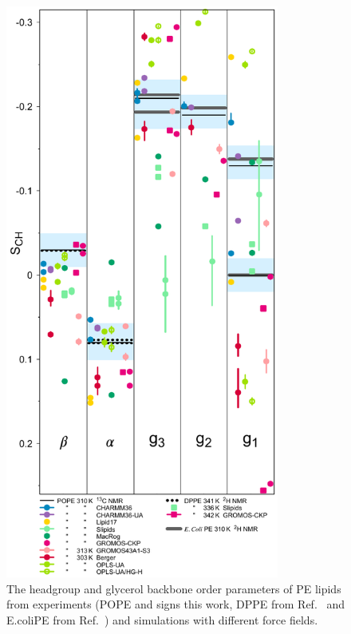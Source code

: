 \documentclass[journal=jpcbfk]{achemso}
\begin{document}
\begin{figure}[]
  \centering
  \includegraphics[width=9.0cm]{./Figs/HGorderparametersPE.pdf}
  \caption{\label{HGorderParametersPE}
    The headgroup and glycerol backbone order parameters of PE lipids
    from experiments (POPE and signs this work, DPPE from Ref.~
    and E.coliPE from Ref.~) and simulations with different force fields.
  }
\end{figure}
\end{document}
